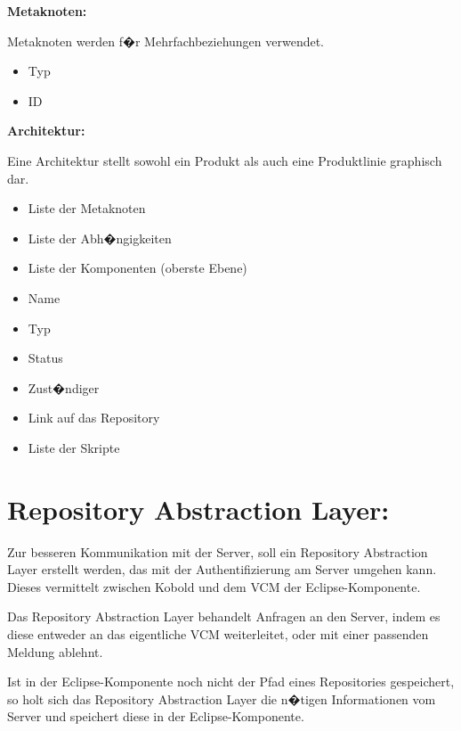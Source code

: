 \textbf{Metaknoten:}\par
Metaknoten werden f�r Mehrfachbeziehungen verwendet.
\begin{itemize}
\item Typ
\item ID\newline
\end{itemize}

\textbf{Architektur:}\par
Eine Architektur stellt sowohl ein Produkt als auch eine Produktlinie graphisch dar.
\begin{itemize}
\item Liste der Metaknoten
\item Liste der Abh�ngigkeiten
\item Liste der Komponenten (oberste Ebene)
\item Name
\item Typ
\item Status
\item Zust�ndiger
\item Link auf das Repository
\item Liste der Skripte
\end{itemize}


\section{Repository Abstraction Layer:}

Zur besseren Kommunikation mit der Server, soll ein Repository Abstraction Layer erstellt werden, das mit der Authentifizierung am Server umgehen kann. Dieses vermittelt zwischen Kobold und dem VCM der Eclipse-Komponente.\newline

Das Repository Abstraction Layer behandelt Anfragen an den Server, indem es diese entweder an das eigentliche VCM weiterleitet, oder mit einer passenden Meldung ablehnt.\par
Ist in der Eclipse-Komponente noch nicht der Pfad eines Repositories gespeichert, so holt sich das Repository Abstraction Layer die n�tigen Informationen vom Server und speichert diese in der Eclipse-Komponente.


